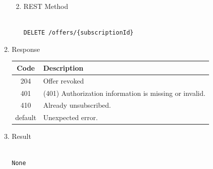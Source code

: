 \begin{enumerate}
\begin{enumerate}
\begin{table}[H]
\begin{center}
\begin{tabular}{|p{3cm}|l|p{3cm}|p{3cm}|p{4cm}|}
\hline

\end{tabular}
\end{center}

\end{table}

\item REST Method

\begin{tcolorbox}[boxrule=0pt, frame empty]
\begin{verbatim} 

DELETE /offers/{subscriptionId}

\end{verbatim}
\end{tcolorbox}

\end{enumerate}

\item Response

\begin{table}[H]
\footnotesize

\begin{center}
\begin{tabular}{|c|l|} 
\hline
\rowcolor{lightgray}	Code 		& 	Description \\
\hline
204	 		&	Offer revoked \\
\hline
401			&	(401) Authorization information is missing or invalid. \\
\hline
410			&	Already unsubscribed. \\
\hline
default		&	Unexpected error. \\
\hline
\end{tabular}
\end{center}

\end{table}

\item Result

\begin{tcolorbox}[boxrule=0pt, frame empty]
\begin{verbatim}

None

\end{verbatim}
\end{tcolorbox}



\end{enumerate}

